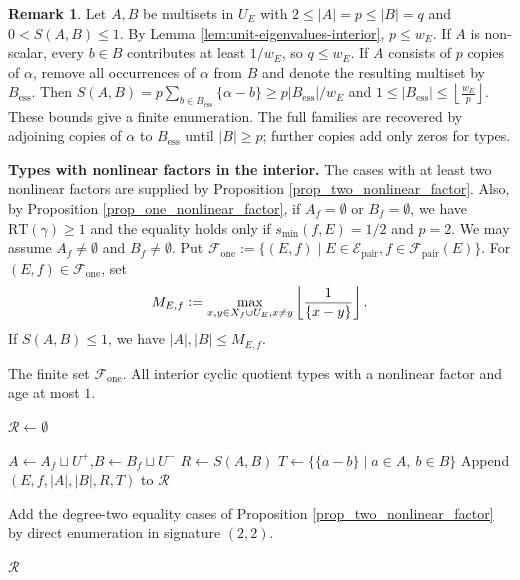 \documentclass[11pt]{amsart}
\theoremstyle{plain}
\theoremstyle{definition}
\newtheorem{rem}[thm]{Remark}
\numberwithin{equation}{section}
\newcommand{\calE}{\mathcal{E}}
\newcommand{\calF}{\mathcal{F}}
\newcommand{\defeq}{\vcentcolon=}
\begin{document}
\begin{rem}
\label{rem:unit-interior-enumeration}
Let $A,B$ be multisets in $U_E$ with
$2\leq |A|=p\leq |B|=q$ and $0<S(A,B)\leq1$.
By Lemma \ref{lem:unit-eigenvalues-interior}, $p\leq w_E$.
If $A$ is non-scalar, every $b\in B$ contributes at least
$1/w_E$, so $q\leq w_E$.
If $A$ consists of $p$ copies of $\alpha$, remove all occurrences
of $\alpha$ from $B$ and denote the resulting multiset by
$B_{\mathrm{ess}}$.
Then $S(A,B)
  =p\sum_{b\in B_{\mathrm{ess}}}\{\alpha-b\}
  \geq p|B_{\mathrm{ess}}|/w_E$ and $
  1\leq |B_{\mathrm{ess}}|
  \leq\left\lfloor\frac{w_E}{p}\right\rfloor$.
These bounds give a finite enumeration.
The full families are recovered by adjoining copies of $\alpha$
to $B_{\mathrm{ess}}$ until $|B|\geq p$; further copies add only zeros for types.
\end{rem}



\noindent\textbf{Types with nonlinear factors in the interior.}
The cases with at least two nonlinear factors are supplied by
Proposition \ref{prop_two_nonlinear_factor}.
Also, by Proposition \ref{prop_one_nonlinear_factor}, if $A_f = \emptyset$ or $B_f = \emptyset$, we have $\mathrm{RT}(\gamma) \geq 1$ and the equality holds only if $s_{\min}(f,E) = 1/2$ and $p=2$.
We may assume $A_f \neq \emptyset$ and $B_f \neq \emptyset$.
Put
$\mathcal F_{\mathrm{one}}
:=\{(E,f)\mid
E\in\mathcal E_{\mathrm{pair}},
f\in\mathcal F_{\mathrm{pair}}(E)\}$.
For $(E,f)\in \mathcal F_{\mathrm{one}}$, set
\[
  M_{E,f} 
  \defeq
  \max_{x,y \in X_f \cup U_E, x \neq y}
  \left\lfloor\frac{1}{\{x-y\}}\right\rfloor.
\]
If $S(A,B) \leq 1$, we have $|A|, |B| \leq M_{E,f}$.
\begin{algorithm}[H]
\caption{Interior low-age types with nonlinear factors}
\label{alg:low-age-types}
\begin{algorithmic}[1]
\Require The finite set $\mathcal F_{\mathrm{one}}$.
\Ensure All interior cyclic quotient types with a nonlinear factor
and age at most $1$.

\State $\mathcal R\gets\emptyset$

\For{each $(E,f)$ with $E \in \calE_{\mathrm{pair}}$ and $f \in \calF_{\mathrm{pair}}(E)$}
      \State $A\gets A_f\sqcup U^+$,\quad $B\gets B_f\sqcup U^-$
        \State $R\gets S(A,B)$
          \State $T\gets\{\{a-b\}\mid a\in A,\ b\in B\}$
          \State Append $(E,f,|A|,|B|,R,T)$ to $\mathcal R$
        \EndIf
      \EndIf
    \EndFor
  \EndFor
\EndFor

\State Add the degree-two equality cases of Proposition
\ref{prop_two_nonlinear_factor} by direct enumeration in signature
$(2,2)$.


\State \Return $\mathcal R$
\end{algorithmic}
\end{algorithm}
\end{document}
